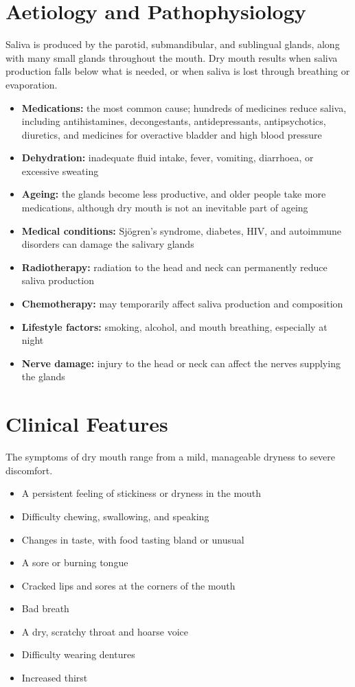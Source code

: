 \section*{Aetiology and Pathophysiology}
Saliva is produced by the parotid, submandibular, and sublingual glands, along with many small glands throughout the mouth. Dry mouth results when saliva production falls below what is needed, or when saliva is lost through breathing or evaporation.
\begin{itemize}
    \item \textbf{Medications:} the most common cause; hundreds of medicines reduce saliva, including antihistamines, decongestants, antidepressants, antipsychotics, diuretics, and medicines for overactive bladder and high blood pressure
    \item \textbf{Dehydration:} inadequate fluid intake, fever, vomiting, diarrhoea, or excessive sweating
    \item \textbf{Ageing:} the glands become less productive, and older people take more medications, although dry mouth is not an inevitable part of ageing
    \item \textbf{Medical conditions:} Sjögren's syndrome, diabetes, HIV, and autoimmune disorders can damage the salivary glands
    \item \textbf{Radiotherapy:} radiation to the head and neck can permanently reduce saliva production
    \item \textbf{Chemotherapy:} may temporarily affect saliva production and composition
    \item \textbf{Lifestyle factors:} smoking, alcohol, and mouth breathing, especially at night
    \item \textbf{Nerve damage:} injury to the head or neck can affect the nerves supplying the glands
\end{itemize}

\section*{Clinical Features}
The symptoms of dry mouth range from a mild, manageable dryness to severe discomfort.
\begin{itemize}
    \item A persistent feeling of stickiness or dryness in the mouth
    \item Difficulty chewing, swallowing, and speaking
    \item Changes in taste, with food tasting bland or unusual
    \item A sore or burning tongue
    \item Cracked lips and sores at the corners of the mouth
    \item Bad breath
    \item A dry, scratchy throat and hoarse voice
    \item Difficulty wearing dentures
    \item Increased thirst
\end{itemize}

